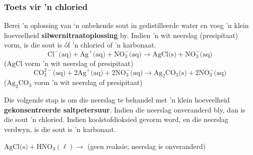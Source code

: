             \subsubsection*{Toets vir 'n chloried}
            \nopagebreak
Berei 'n oplossing van ‘n onbekende sout in gedistilleerde water en voeg 'n klein hoeveelheid \textbf{silwernitraatoplossing} by. Indien 'n wit neerslag (presipitaat) vorm, is die sout is óf 'n chloried of 'n karbonaat.
        \label{m38719*id341148}\nopagebreak\noindent{}
    \begin{equation*}
    {\text{Cl}}^{-} \text{(aq)} +{\text{Ag}}^{+} \text{(aq)} + \text{NO}_{3}^{-} \text{(aq)} \to \text{AgCl} \text{(s)} +\text{NO}_{3}^{-} \text{(aq)}
      \end{equation*}
     ($\text{AgCl}$ vorm 'n wit neerslag of presipitaat)
        \label{m38719*id341211}\nopagebreak\noindent{}
    \begin{equation*}
    \text{CO}_{3}^{2-} \text{(aq)} + 2{\text{Ag}}^{+} \text{(aq)} + 2\text{NO}_{3}^{-} \text{(aq)} \to {\text{Ag}}_{2}{\text{CO}}_{3} \text{(s)} + 2\text{NO}_{3}^{-} \text{(aq)}
      \end{equation*}
    (${\text{Ag}}_{2}{\text{CO}}_{3}$ vorm 'n wit neerslag of presipitaat)\par 
        \label{m38719*id341323}Die volgende stap is om die neerslag te behandel met 'n klein hoeveelheid \textbf{gekonsentreerde saltpetersuur}. Indien die neerslag onveranderd bly, dan is die sout 'n chloried.  Indien koolstofdioksied gevorm word, en die neerslag verdwyn, is die sout is 'n karbonaat.\par 
        \label{m38719*id341334}$\text{AgCl} \text{(s)} + {\text{HNO}}_{3} (\ell) \to $ (geen reaksie; neerslag is onveranderd)\par 
